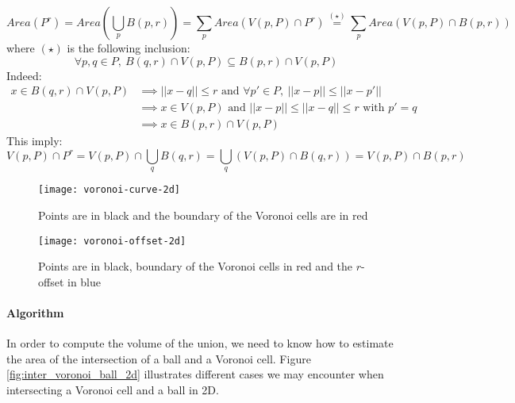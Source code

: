 \begin{equation}
    Area(P^r) = Area \left( \bigcup_p B(p, r) \right) = \sum_p Area(V(p, P)
    \cap P^r) \stackrel{(\star)}{=} \sum_p Area(V(p, P) \cap B(p, r))
    \label{eqn:area-union-balls}
\end{equation}
where $ (\star) $ is the following inclusion:
$$ \forall p, q \in P,~ B(q, r) \cap V(p, P) \subseteq B(p, r) \cap V(p, P) $$
Indeed:
\begin{align*}
    x \in B(q, r) \cap V(p, P) & \implies || x - q || \leq r \text{ and } \forall
    p' \in P,~ || x - p || \leq || x - p' || \\
    & \implies x \in V(p, P) \text{ and } || x - p || \leq || x - q || \leq r
    \text { with } p' = q \\
    & \implies x \in B(p, r) \cap V(p, P)
\end{align*}
This imply:
$$
V(p, P) \cap P^r = V(p, P) \cap \bigcup_q B(q, r) = \bigcup_q \left( V(p, P) \cap B(q,
r) \right) = V(p, P) \cap B(p, r)
$$

\begin{figure}[h]
    \centering
    \texttt{[image: voronoi-curve-2d]}
    \caption{Points are in black and the boundary of the Voronoi cells are in
        red}
    \label{fig:voronoi-diagram-2d}
\end{figure}

\begin{figure}[h]
    \centering
    \texttt{[image: voronoi-offset-2d]}
    \caption{Points are in black, boundary of the Voronoi cells in red and the
        $r$-offset in blue}
    \label{fig:voronoi-offset-2d}
\end{figure}

\paragraph{Algorithm}

In order to compute the volume of the union, we need to know how to estimate the
area of the intersection of a ball and a Voronoi cell. Figure
\ref{fig:inter_voronoi_ball_2d} illustrates different cases we may encounter
when intersecting a Voronoi cell and a ball in 2D.

